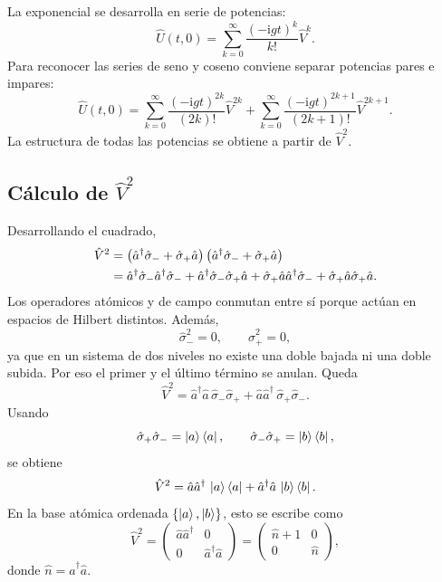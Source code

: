 \documentclass[11pt]{article}
\newcommand{\ii}{\mathrm{i}}
\newcommand{\adag}{\hat a^\dagger}
\newcommand{\sigmap}{\hat\sigma_+}
\newcommand{\sigmam}{\hat\sigma_-}
\newcommand{\nnop}{\hat n}
\begin{document}
La exponencial se desarrolla en serie de potencias:
\begin{equation}
  \hat U(t,0)
  =
  \sum_{k=0}^{\infty}\frac{(-\ii gt)^k}{k!}\hat V^k.
\end{equation}
Para reconocer las series de seno y coseno conviene separar potencias pares e
impares:
\begin{equation}
  \hat U(t,0)
  =
  \sum_{k=0}^{\infty}\frac{(-\ii gt)^{2k}}{(2k)!}\hat V^{2k}
  +
  \sum_{k=0}^{\infty}\frac{(-\ii gt)^{2k+1}}{(2k+1)!}\hat V^{2k+1}.
\end{equation}
La estructura de todas las potencias se obtiene a partir de $\hat V^2$.

\subsection{C\'alculo de \texorpdfstring{$\hat V^2$}{V al cuadrado}}

Desarrollando el cuadrado,
\begin{align}
  \hat V^2
  &=
  \left(\adag\sigmam+\sigmap\hat a\right)
  \left(\adag\sigmam+\sigmap\hat a\right) \notag\\
  &=
  \adag\sigmam\adag\sigmam
  +
  \adag\sigmam\sigmap\hat a
  +
  \sigmap\hat a\adag\sigmam
  +
  \sigmap\hat a\sigmap\hat a .
\end{align}
Los operadores at\'omicos y de campo conmutan entre s\'i porque act\'uan en
espacios de Hilbert distintos. Adem\'as,
\begin{equation}
  \sigmam^2=0,
  \qquad
  \sigmap^2=0,
\end{equation}
ya que en un sistema de dos niveles no existe una doble bajada ni una doble
subida. Por eso el primer y el \'ultimo t\'ermino se anulan. Queda
\begin{equation}
  \hat V^2
  =
  \adag\hat a\,\sigmam\sigmap
  +
  \hat a\adag\,\sigmap\sigmam.
\end{equation}
Usando
\begin{equation}
  \sigmap\sigmam=\ket{a}\bra{a},
  \qquad
  \sigmam\sigmap=\ket{b}\bra{b},
\end{equation}
se obtiene
\begin{equation}
  \hat V^2
  =
  \hat a\adag\,\ket{a}\bra{a}
  +
  \adag\hat a\,\ket{b}\bra{b}.
\end{equation}
En la base at\'omica ordenada $\{\ket{a},\ket{b}\}$, esto se escribe como
\begin{equation}
  \hat V^2
  =
  \begin{pmatrix}
    \hat a\adag & 0\\
    0 & \adag\hat a
  \end{pmatrix}
  =
  \begin{pmatrix}
    \nnop+1 & 0\\
    0 & \nnop
  \end{pmatrix},
\end{equation}
donde $\nnop=\adag\hat a$.
\end{document}
